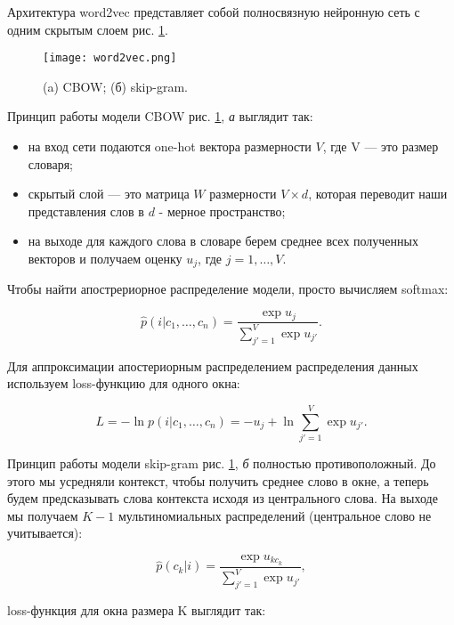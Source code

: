 \bigskip
Архитектура word2vec представляет собой полносвязную нейронную сеть с одним скрытым слоем рис.
\ref{fig:word2vec}.

\begin{figure}[ht]
    \centering
    \texttt{[image: word2vec.png]}
    \caption{(a) CBOW; (б) skip-gram.}
    \label{fig:word2vec}
\end{figure}

Принцип работы модели CBOW \cite{Nikolenko} рис. \ref{fig:word2vec}, \textit{а}  выглядит так:

\bigskip
\begin{itemize}
 \item на вход сети подаются one-hot вектора размерности $V$, где V --- это размер словаря;
 \item скрытый слой --- это матрица $W$ размерности $V\times d$, которая переводит наши представления слов в
$d$ - мерное пространство;
 \item на выходе для каждого слова в словаре берем среднее всех полученных векторов и получаем оценку $u_j$,
где $j = 1, \ldots, V$.
\end{itemize}

\bigskip
Чтобы найти апострериорное распределение модели, просто вычисляем softmax:

\begin{equation}
 \hat{p}(i|c_1, \ldots, c_n) = \frac{\exp{u_j}}{\sum_{j'=1}^V \exp{u_{j'}}}.
\end{equation}

Для аппроксимации апостериорным распределением распределения данных используем loss-функцию для одного окна:

\begin{equation}
 L = -\ln{p(i|c_1, \ldots, c_n)} = - u_j + \ln{\sum_{j'=1}^{V} \exp{u_{j'}}}.
\end{equation}

Принцип работы модели skip-gram рис. \ref{fig:word2vec}, \textit{б} полностью противоположный. До этого мы
усредняли контекст, чтобы получить среднее слово в окне, а теперь будем предсказывать слова контекста исходя
из центрального слова. На выходе мы получаем $K-1$ мультиномиальных распределений (центральное слово не
учитывается):

\begin{equation}
 \hat{p}(c_k|i) = \frac{\exp{u_{kc_k}}}{\sum_{j'=1}^V \exp{u_{j'}}},
\end{equation}

loss-функция для окна размера K выглядит так:

